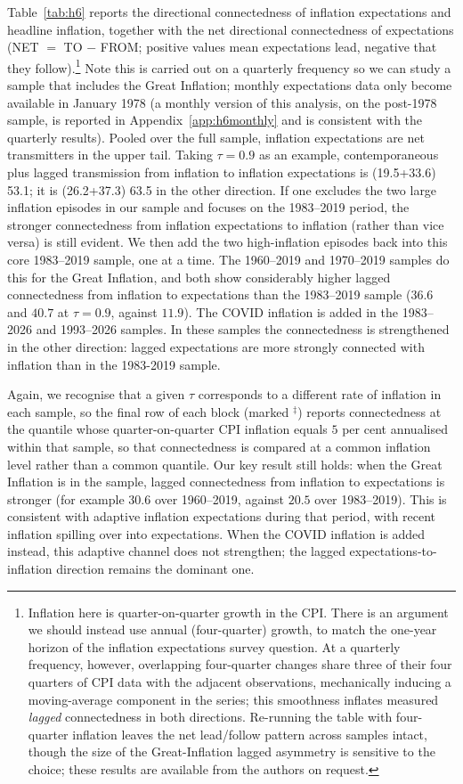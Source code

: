 \documentclass{article}
\begin{document}
Table~\ref{tab:h6} reports the directional connectedness of
inflation expectations and headline inflation, together with the net directional connectedness of expectations (NET $=$ TO $-$ FROM; positive values mean expectations lead, negative that they follow).\footnote{Inflation here is quarter-on-quarter growth in the CPI. There is an argument we should instead use annual (four-quarter) growth, to match the one-year horizon of the inflation expectations survey question. At a quarterly frequency, however, overlapping four-quarter changes share three of their four quarters of CPI data with the adjacent observations, mechanically inducing a moving-average component in the series; this smoothness inflates measured \emph{lagged} connectedness in both directions. Re-running the table with four-quarter inflation leaves the net lead/follow pattern across samples intact, though the size of the Great-Inflation lagged asymmetry is sensitive to the choice; these results are available from the authors on request.} Note this is carried out on a quarterly frequency so we can study a sample that includes the Great Inflation; monthly expectations data only become available in January 1978 (a monthly version of this analysis, on the post-1978 sample, is reported in Appendix~\ref{app:h6monthly} and is consistent with the quarterly results). Pooled over the full sample, inflation expectations are net transmitters in the upper tail. Taking $\tau=0.9$ as an example, contemporaneous plus lagged transmission from inflation to inflation expectations is (19.5+33.6) 53.1; it is (26.2+37.3) 63.5 in the other direction. If one excludes the two large inflation episodes in our sample and focuses on the 1983--2019 period, the stronger connectedness from inflation expectations to inflation (rather than vice versa) is still evident. We then add the two high-inflation episodes back into this core 1983--2019 sample, one at a time. The 1960--2019 and 1970--2019 samples do this for the Great Inflation, and both show considerably higher lagged connectedness from inflation to expectations than the 1983--2019 sample ($36.6$ and $40.7$ at $\tau=0.9$, against $11.9$). The COVID inflation is added in the 1983--2026 and 1993--2026 samples. In these samples the connectedness is strengthened in the other direction: lagged expectations are more strongly connected with inflation than in the 1983-2019 sample.

Again, we recognise that a given $\tau$ corresponds to a different rate of inflation in each sample, so the final row of each block (marked $^{\ddagger}$) reports connectedness at the quantile whose quarter-on-quarter CPI inflation equals $5$ per cent annualised within that sample, so that connectedness is compared at a common inflation level rather than a common quantile. Our key result still holds: when the Great Inflation is in the sample, lagged connectedness from inflation to expectations is stronger (for example $30.6$ over 1960--2019, against $20.5$ over 1983--2019). This is consistent with adaptive inflation expectations during that period, with recent inflation spilling over into expectations. When the COVID inflation is added instead, this adaptive channel does not strengthen; the lagged expectations-to-inflation direction remains the dominant one. 
\end{document}
